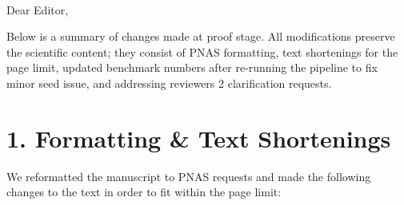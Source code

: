 \documentclass[10pt]{article}
\begin{document}
\noindent{\Large\bfseries\textcolor{accent}{Summary of Proof-Stage Revisions}}\\[4pt]

\vspace{6pt}

\noindent Dear Editor,

\vspace{4pt}

\noindent Below is a summary of changes made at proof stage. All modifications
preserve the scientific content; they consist of PNAS formatting, text shortenings
for the page limit, updated benchmark numbers after re-running the pipeline to fix minor seed issue, 
and addressing reviewers 2 clarification requests.

\section*{\textcolor{accent}{1. Formatting \& Text Shortenings}}

We reformatted the manuscript to PNAS requests and made the following changes to the text in order to fit within the page limit:
\end{document}
